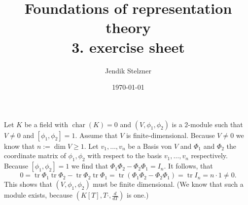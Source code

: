 \documentclass[a4paper,10pt]{article}
\title{Foundations of representation theory \\ 3. exercise sheet}
\author{Jendik Stelzner}
\date{\today}
\newcommand{\kchar}{\operatorname{char}}
\newcommand{\tr}{\operatorname{tr}}
\begin{document}
\maketitle

\section{}

\section{}

\section{}

\section{}
Let $K$ be a field with $\kchar(K) = 0$ and $(V,\phi_1,\phi_2)$ is a  $2$-module such that $V \neq 0$ and $[\phi_1, \phi_2] = 1$. Assume that $V$ is finite-dimensional. Because $V \neq 0$ we know that $n := \dim V \geq 1$. Let $v_1, \ldots, v_n$ be a Basis von $V$ and $\Phi_1$ and $\Phi_2$ the coordinate matrix of $\phi_1, \phi_2$ with respect to the basis $v_1, \ldots, v_n$ respectively. Because $[\phi_1, \phi_2] = 1$ we find that $\Phi_1 \Phi_2 - \Phi_2 \Phi_1 = I_n$. It follows, that
\[
 0
 = \tr \Phi_1 \tr \Phi_2 - \tr \Phi_2 \tr \Phi_1
 = \tr (\Phi_1\Phi_2-\Phi_2\Phi_1)
 = \tr I_n
 = n \cdot 1
 \neq 0.
\]
This shows that $(V,\phi_1,\phi_2)$ must be finite dimensional. (We know that such a module exists, because $\left(K[T], T\cdot, \frac{d}{dT}\right)$ is one.)
\end{document}
